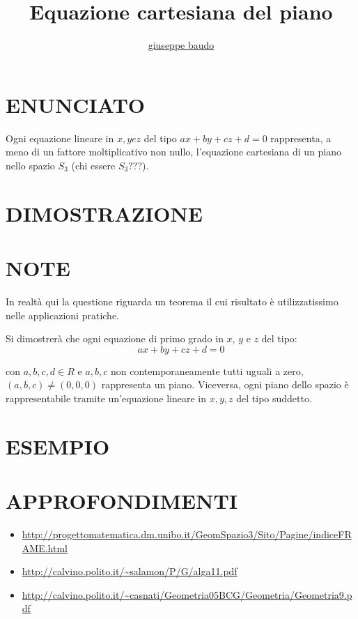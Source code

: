 \documentclass[a4paper,10pt]{article}
\title{Equazione cartesiana del piano}
\author{\href{http://www.baudo.hol.es}{giuseppe baudo}}
\begin{document}
\maketitle

\section{ENUNCIATO}
Ogni equazione lineare in $x,y e z$ del tipo $ax+by+cz+d=0$ rappresenta, a meno di un fattore moltiplicativo non nullo,
l'equazione cartesiana di un piano nello spazio $S_3$ (chi essere $S_3$???).

\section{DIMOSTRAZIONE}

\section{NOTE}
In realtà qui la questione riguarda un teorema il cui risultato è utilizzatissimo nelle applicazioni pratiche.

Si dimostrerà che ogni equazione di primo grado in $x$, $y$ e $z$ del tipo:
\[
 ax+by+cz+d=0
\]

con $a,b,c,d \in R$ e $a,b,c$ non contemporaneamente tutti uguali a zero, $(a,b,c) \ne (0,0,0)$ rappresenta un piano. 
Viceversa, ogni piano dello spazio è rappresentabile tramite un'equazione lineare in $x,y,z$ del tipo suddetto.


\section{ESEMPIO}

\section{APPROFONDIMENTI}
\begin{itemize}
 \item \url{http://progettomatematica.dm.unibo.it/GeomSpazio3/Sito/Pagine/indiceFRAME.html}
 \item \url{http://calvino.polito.it/~salamon/P/G/alga11.pdf}
 \item \url{http://calvino.polito.it/~casnati/Geometria05BCG/Geometria/Geometria9.pdf}
\end{itemize}
\end{document}
